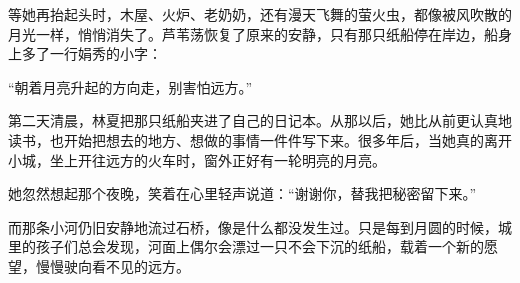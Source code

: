 \documentclass[12pt]{article}
\begin{document}
等她再抬起头时，木屋、火炉、老奶奶，还有漫天飞舞的萤火虫，都像被风吹散的月光一样，悄悄消失了。芦苇荡恢复了原来的安静，只有那只纸船停在岸边，船身上多了一行娟秀的小字：

\begin{center}
“朝着月亮升起的方向走，别害怕远方。”
\end{center}

第二天清晨，林夏把那只纸船夹进了自己的日记本。从那以后，她比从前更认真地读书，也开始把想去的地方、想做的事情一件件写下来。很多年后，当她真的离开小城，坐上开往远方的火车时，窗外正好有一轮明亮的月亮。

她忽然想起那个夜晚，笑着在心里轻声说道：“谢谢你，替我把秘密留下来。”

而那条小河仍旧安静地流过石桥，像是什么都没发生过。只是每到月圆的时候，城里的孩子们总会发现，河面上偶尔会漂过一只不会下沉的纸船，载着一个新的愿望，慢慢驶向看不见的远方。
\end{document}
